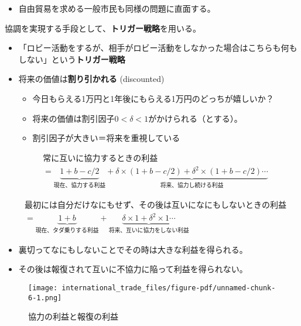 \documentclass[
  xelatex,
  ja=standard]{bxjsarticle}
\providecommand{\tightlist}{%
  \setlength{\itemsep}{0pt}\setlength{\parskip}{0pt}}\usepackage{longtable,booktabs,array}
\begin{document}
\begin{itemize}
\tightlist
\item
  自由貿易を求める一般市民も同様の問題に直面する。
\end{itemize}

協調を実現する手段として、\textbf{トリガー戦略}を用いる。

\begin{itemize}
\tightlist
\item
  「ロビー活動をするが、相手がロビー活動をしなかった場合はこちらも何もしない」という\textbf{トリガー戦略}
\item
  将来の価値は\textbf{割り引かれる} (discounted)

  \begin{itemize}
  \tightlist
  \item
    今日もらえる1万円と1年後にもらえる1万円のどっちが嬉しいか？
  \item
    将来の価値は割引因子\(0 < \delta < 1\)がかけられる（とする）。
  \item
    割引因子が大きい＝将来を重視している
  \end{itemize}
\end{itemize}

\[
\begin{split}
&\textrm{常に互いに協力するときの利益} \\
&= \underbrace{1+b-c/2}_{\textrm{現在、協力する利益}} + \underbrace{\delta \times (1+b-c/2) + \delta^2 \times (1+b-c/2) \cdots}_{\textrm{将来、協力し続ける利益}}
\end{split}
\]

\[
\begin{split}
&\textrm{最初には自分だけなにもせず、その後は互いになにもしないときの利益} \\
&= \underbrace{1+b}_{\textrm{現在、タダ乗りする利益}} + \underbrace{\delta \times 1 + \delta^2 \times 1 \cdots}_{\textrm{将来、互いに協力をしない利益}}
\end{split}
\]

\begin{itemize}
\tightlist
\item
  裏切ってなにもしないことでその時は大きな利益を得られる。
\item
  その後は報復されて互いに不協力に陥って利益を得られない。
\end{itemize}

\begin{figure}[htpb]

{\centering \texttt{[image: international\_trade\_files/figure-pdf/unnamed-chunk-6-1.png]}

}

\caption{協力の利益と報復の利益}

\end{figure}
\end{document}
